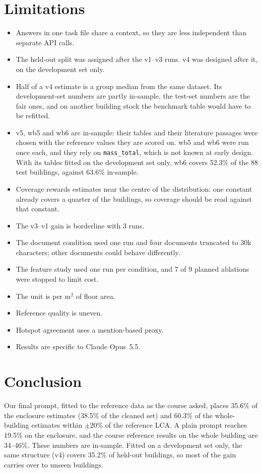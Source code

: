 \documentclass[10pt,letterpaper]{article}
\begin{document}
\section{Limitations}
\begin{itemize}
\item Answers in one task file share a context, so they are less independent than separate API calls.
\item The held-out split was assigned after the v1--v3 runs. v4 was designed after it, on the development set only.
\item Half of a v4 estimate is a group median from the same dataset. Its development-set numbers are partly in-sample, the test-set numbers are the fair ones, and on another building stock the benchmark table would have to be refitted.
\item v5, wb5 and wb6 are in-sample: their tables and their literature passages were chosen with the reference values they are scored on. wb5 and wb6 were run once each, and they rely on \texttt{mass\_total}, which is not known at early design. With its tables fitted on the development set only, wb6 covers 52.3\% of the 88 test buildings, against 63.6\% in-sample.
\item Coverage rewards estimates near the centre of the distribution: one constant already covers a quarter of the buildings, so coverage should be read against that constant.
\item The v3--v1 gain is borderline with 3 runs.
\item The document condition used one run and four documents truncated to 30k characters; other documents could behave differently.
\item The feature study used one run per condition, and 7 of 9 planned ablations were stopped to limit cost.
\item The unit is per m$^2$ of floor area.
\item Reference quality is uneven.
\item Hotspot agreement uses a mention-based proxy.
\item Results are specific to Claude Opus~5.5.
\end{itemize}

\section{Conclusion}
Our final prompt, fitted to the reference data as the course asked, places 35.6\% of the enclosure estimates (38.5\% of the cleaned set) and 60.3\% of the whole-building estimates within $\pm$20\% of the reference LCA. A plain prompt reaches 19.5\% on the enclosure, and the course reference results on the whole building are 34--46\%. These numbers are in-sample. Fitted on a development set only, the same structure (v4) covers 35.2\% of held-out buildings, so most of the gain carries over to unseen buildings.
\end{document}
